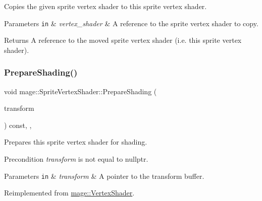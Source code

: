 Copies the given sprite vertex shader to this sprite vertex shader.


\begin{DoxyParams}[1]{Parameters}
\mbox{\tt in}  & {\em vertex\+\_\+shader} & A reference to the sprite vertex shader to copy. \\
\hline
\end{DoxyParams}
\begin{DoxyReturn}{Returns}
A reference to the moved sprite vertex shader (i.\+e. this sprite vertex shader). 
\end{DoxyReturn}
\hypertarget{classmage_1_1_sprite_vertex_shader_a10be47ca65f4baed735b5ffb52ee92bf}{}\label{classmage_1_1_sprite_vertex_shader_a10be47ca65f4baed735b5ffb52ee92bf} 
\subsubsection{\texorpdfstring{Prepare\+Shading()}{PrepareShading()}}
{\footnotesize\ttfamily void mage\+::\+Sprite\+Vertex\+Shader\+::\+Prepare\+Shading (\begin{DoxyParamCaption}\item[{I\+D3\+D11\+Buffer $\ast$}]{transform }\end{DoxyParamCaption}) const\hspace{0.3cm}{\ttfamily [final]}, {\ttfamily [override]}, {\ttfamily [virtual]}}

Prepares this sprite vertex shader for shading.

\begin{DoxyPrecond}{Precondition}
{\itshape transform} is not equal to {\ttfamily nullptr}. 
\end{DoxyPrecond}

\begin{DoxyParams}[1]{Parameters}
\mbox{\tt in}  & {\em transform} & A pointer to the transform buffer. \\
\hline
\end{DoxyParams}


Reimplemented from \hyperlink{classmage_1_1_vertex_shader_a53f4b25241f6c5739724d421c9f29a36}{mage\+::\+Vertex\+Shader}.


